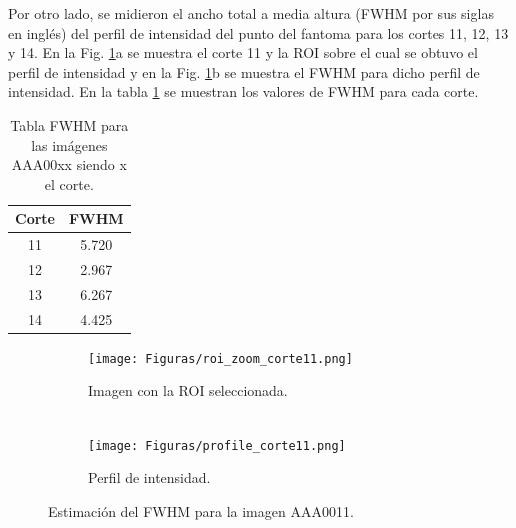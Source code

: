 \documentclass[11pt,twocolumn,twoside]{opticajnl}
\begin{document}
Por otro lado, se midieron el ancho total a media altura (FWHM por sus siglas en inglés) del perfil de intensidad del punto del fantoma para los cortes 11, 12, 13 y 14. En la Fig. \ref{fig:FWHM}a se muestra el corte 11 y la ROI sobre el cual se obtuvo el perfil de intensidad y en la Fig. \ref{fig:FWHM}b se muestra el FWHM para dicho perfil de intensidad. En la tabla \ref{tab:FWHM} se muestran los valores de FWHM para cada corte.

\begin{table}[h]
    \centering
    \begin{tabular}{c||c}
    \hline
    Corte & FWHM  \\ \hline
    11    & 5.720   \\ \hline
    12    & 2.967   \\ \hline
    13    & 6.267   \\ \hline
    14    & 4.425   \\ \hline
    \end{tabular}
    \caption{Tabla FWHM para las imágenes AAA00xx siendo x el corte.} 
    \label{tab:FWHM}
\end{table}

\begin{figure}[h]
    \centering
         \begin{subfigure}[h]{0.49\linewidth}
            \centering
            \texttt{[image: Figuras/roi\_zoom\_corte11.png]}
            \caption{Imagen con la ROI seleccionada. \\
            $~$} 
         \end{subfigure}
         \begin{subfigure}[h]{0.49\linewidth}
            \centering
            \texttt{[image: Figuras/profile\_corte11.png]}
            \caption{Perfil de intensidad.}
         \end{subfigure}
    \caption{Estimación del FWHM para la imagen AAA0011.}
    \label{fig:FWHM}
\end{figure}


\end{document}
